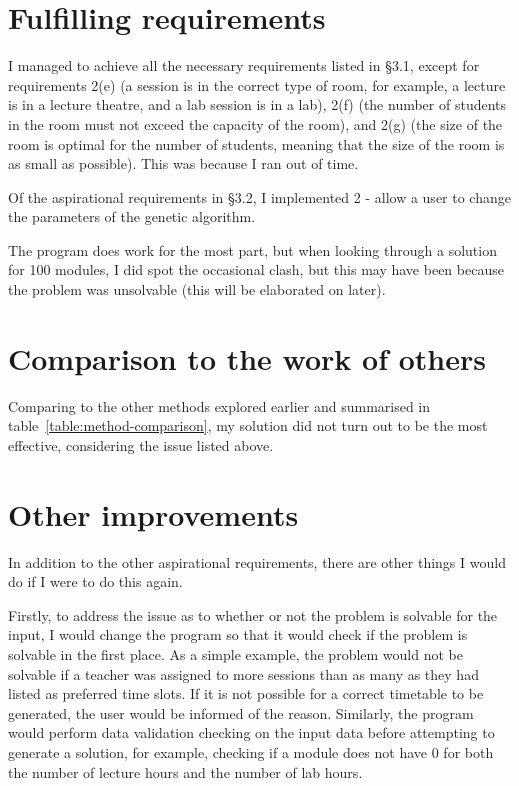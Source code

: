\section{Fulfilling requirements}

I managed to achieve all the necessary requirements listed in \S3.1, except for
requirements 2(e) (a session is in the correct type of room, for example, a
lecture is in a lecture theatre, and a lab session is in a lab), 2(f) (the 
number of students in the room must not exceed the capacity of the room), and
2(g) (the size of the room is optimal for the number of students, meaning that
the size of the room is as small as possible).
This was because I ran out of time.

Of the aspirational requirements in \S3.2, I implemented 2 - allow a user to
change the parameters of the genetic algorithm.

The program does work for the most part, but when looking through a solution for
100 modules, I did spot the occasional clash, but this may have been because
the problem was unsolvable (this will be elaborated on later).

\section{Comparison to the work of others}

Comparing to the other methods explored earlier and summarised in 
table~\ref*{table:method-comparison}, my solution did not turn out to be the
most effective, considering the issue listed above.

\section{Other improvements}

In addition to the other aspirational requirements, there are other things I 
would do if I were to do this again.

Firstly, to address the issue as to whether or not the problem is solvable for
the input, I would change the program so that it would check if the problem is
solvable in the first place. 
As a simple example, the problem would not be solvable if a teacher was assigned
to more sessions than as many as they had listed as preferred time slots.
If it is not possible for a correct timetable to be generated, the user would
be informed of the reason.
Similarly, the program would perform data validation checking on the input data
before attempting to generate a solution, for example, checking if a module does
not have 0 for both the number of lecture hours and the number of lab hours. 

